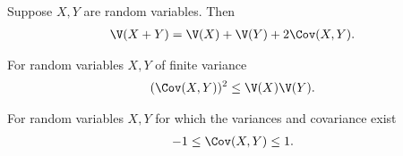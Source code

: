 \documentclass{article}
\begin{document}
\begin{theorem}
    Suppose $X,Y$ are random variables. Then
    \begin{align*}
        \V(X+Y)=\V(X)+\V(Y)+2\Cov(X,Y).
    \end{align*}
\end{theorem}
\begin{theorem}
    For random variables $X,Y$ of finite variance
    \begin{align*}
        (\Cov(X,Y))^2\leq \V(X)\V(Y).
    \end{align*}
\end{theorem}
\begin{corollary}
    For random variables $X,Y$ for which the variances and covariance
    exist
    \begin{align*}
        -1 \leq \Cov(X,Y) \leq 1.
    \end{align*}
\end{corollary}
\end{document}
